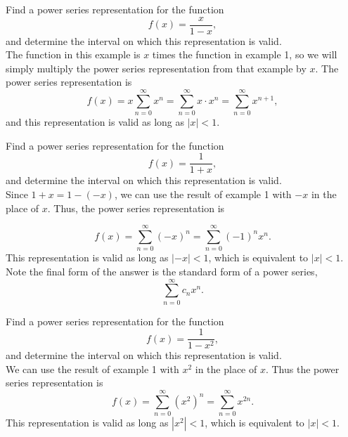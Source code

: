 \documentclass{ximera}
\begin{document}
\begin{example}[example 3]
Find a power series representation for the function
\[
f(x) = \frac{x}{1-x},
\]
and determine the interval on which this representation is valid.\\
The function in this example is $x$ times the function in example 1, 
so we will simply multiply the power series representation from that example by $x$.
The power series representation is
\[
f(x) = x\sum_{n=0}^\infty x^n  = \sum_{n=0}^\infty x\cdot x^n = \sum_{n=0}^\infty x^{n+1},
\]
and this representation is valid as long as $|x| < 1$.

\end{example}


\begin{example}[example 4]
Find a power series representation for the function
\[
f(x) = \frac{1}{1 + x},
\]
and determine the interval on which this representation is valid.\\
Since $1 + x = 1 - (-x)$, we can use the result of example 1 with $-x$ in the place of $x$.
Thus, the power series representation is

\[
f(x) = \sum_{n=0}^\infty (-x)^n = \sum_{n=0}^\infty (-1)^n x^n.
\]
This representation is valid as long as $|-x| < 1$, which is equivalent to $|x| < 1$.
Note the final form of the answer is the standard form of a power series,
\[
\sum_{n=0}^\infty c_nx^n.
\]

\end{example}



\begin{example}[example 5]
Find a power series representation for the function
\[
f(x) = \frac{1}{1-x^2},
\]
and determine the interval on which this representation is valid.\\
We can use the result of example 1 with $x^2$ in the place of $x$.
Thus the power series representation is
\[
f(x) = \sum_{n=0}^\infty (x^2)^n  = \sum_{n=0}^\infty x^{2n}. 
\]
This representation is valid as long as $|x^2| < 1$, which is equivalent to $|x| < 1$.

\end{example}
\end{document}
